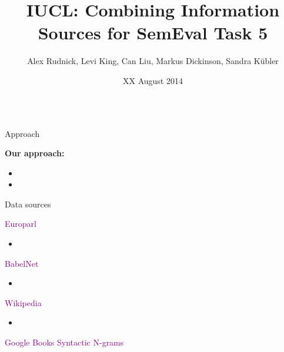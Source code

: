 \documentclass[final,t]{beamer}
\title[]{IUCL: Combining Information Sources for SemEval Task 5}
\author[]{Alex Rudnick, Levi King, Can Liu, Markus Dickinson, Sandra K\"ubler}
\institute[]{Indiana University}
\date[]{XX August 2014}
\begin{document}
\begin{frame}{}
  \begin{columns}[t]
    \begin{column}{.31\linewidth}

\begin{block}{Approach}

  \textbf{Our approach:} 
  \begin{itemize}
  \item 
  \item 
  \end{itemize}

\end{block}

\begin{block}{Data sources}

\begin{center}
\textcolor{purple}{Europarl}
\end{center}

\colorbox{light-gray}{
\begin{minipage}{.90\linewidth}
\begin{itemize}
\item 
\end{itemize}
\end{minipage}
}

\begin{center}
\textcolor{purple}{BabelNet}
\end{center}

\colorbox{light-gray}{
\begin{minipage}{.90\linewidth}
\begin{itemize}
\item
\end{itemize}
\end{minipage}
}

\begin{center}
\textcolor{purple}{Wikipedia}
\end{center}

\colorbox{light-gray}{
\begin{minipage}{.90\linewidth}
\begin{itemize}
\item
\end{itemize}
\end{minipage}
}

\begin{center}
\textcolor{purple}{Google Books Syntactic N-grams}
\end{center}


\end{block}
\end{column}
\end{columns}
\end{frame}
\end{document}
